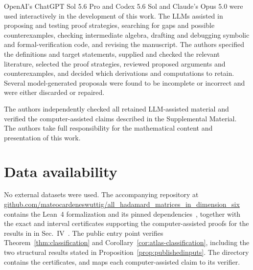 \documentclass[aps,prx,reprint,nofootinbib,twoside,superscriptaddress,longbibliography,floatfix]{revtex4-2}
\theoremstyle{definition}
\begin{document}
OpenAI's ChatGPT Sol 5.6 Pro and Codex 5.6 Sol and Claude's Opus 5.0 were used interactively in the development of this work. The LLMs assisted in proposing and testing proof strategies, searching for gaps and possible counterexamples, checking intermediate algebra, drafting and debugging symbolic and formal-verification code, and revising the manuscript. 
%
The authors specified the definitions and target statements, supplied and checked the relevant literature, selected the proof strategies, reviewed proposed arguments and counterexamples, and decided which derivations and computations to retain.
%
Several model-generated proposals were found to be incomplete or incorrect and were either discarded or repaired. 

The authors independently checked all retained LLM-assisted material and verified the computer-assisted claims described in the Supplemental Material. The authors take full responsibility for the mathematical content and presentation of this work.

\section*{Data availability}
No external datasets were used. The accompanying repository at \url{github.com/mateocardeneswuttig/all_hadamard_matrices_in_dimension_six} contains the Lean~4 formalization and its pinned dependencies~\cite{CardenesWuttig2026HadamardRepository}, together with
the exact and interval certificates supporting the computer-assisted proofs for the results in
in Sec.~IV~\cite{CardenesWuttig2026HadamardRepository}. The public entry point  verifies Theorem~\ref{thm:classification} and Corollary~\ref{cor:atlas-classification}, including the two structural results stated in Proposition~\ref{prop:publishedinputs}. The  directory contains the certificates, and  maps each computer-assisted claim to its verifier.


\fi


\clearpage
\onecolumngrid

\setcounter{section}{0}
\setcounter{subsection}{0}
\renewcommand{\thesection}{\Roman{section}}

\setcounter{equation}{0}
\renewcommand{\theequation}{S.\arabic{section}.\arabic{equation}}
\end{document}
